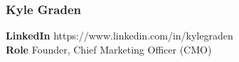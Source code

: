 \documentclass[11pt]{article}
\begin{document}
\subsubsection{Kyle Graden}
\begin{minipage}{\textwidth}
\textbf{LinkedIn} https://www.linkedin.com/in/kylegraden\\
\textbf{Role} Founder, Chief Marketing Officer (CMO)\\
\end{minipage}

\pagebreak

\printbibliography

\vspace*{\fill}

\begin{flushright}

\pdfcreationdate
\end{flushright}
\end{document}
